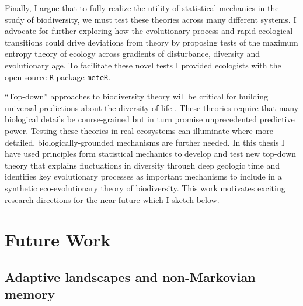 Finally, I argue that to fully realize the utility of statistical
mechanics in the study of biodiversity, we must test these theories
across many different systems.  I advocate for further exploring how
the evolutionary process and rapid ecological transitions could drive
deviations from theory by proposing tests of the maximum entropy
theory of ecology \citep{harte2011} across gradients of disturbance,
diversity and evolutionary age.  To facilitate these novel tests I
provided ecologists with the open source \texttt{R} package
\texttt{meteR}.

``Top-down'' approaches to biodiversity theory will be critical for
building universal predictions about the diversity of life
\citep{harte2011, krakauer2011}.  These theories require that many
biological details be course-grained but in turn promise unprecedented
predictive power.  Testing these theories in real ecosystems can
illuminate where more detailed, biologically-grounded mechanisms are
further needed.  In this thesis I have used principles form
statistical mechanics to develop and test new top-down theory that
explains fluctuations in diversity through deep geologic time and
identifies key evolutionary processes as important mechanisms to
include in a synthetic eco-evolutionary theory of biodiversity.  This
work motivates exciting research directions for the near future which
I sketch below.






\section{Future Work}

\subsection{Adaptive landscapes and non-Markovian memory}

